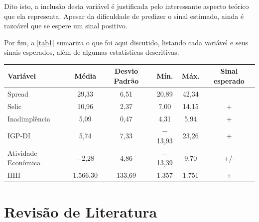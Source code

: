 \documentclass[a4paper,
               article,
               12pt,
               openany,
               oneside,
               english,
               brazil]{abntex2}
\numberwithin{equation}{section}
\begin{document}
    Dito isto, a inclusão desta variável é justificada pelo interessante aspecto teórico que ela representa. Apesar da dificuldade de predizer o sinal estimado, ainda é razoável que se espere um sinal positivo.

    Por fim, a \autoref{tab1} sumariza o que foi aqui discutido, listando cada variável e seus sinais esperados, além de algumas estatísticas descritivas.

    \begin{table}[h]
        {%
            \begin{tabular}
                {@{\extracolsep{5pt}}lccccc}
                \midrule
                Variável              & \multicolumn{1}{c}{Média} & \multicolumn{1}{c}{Desvio Padrão} & \multicolumn{1}{c}{Mín.} & \multicolumn{1}{c}{Máx.} & \multicolumn{1}{c}{Sinal esperado} \\
                \midrule
                Spread                & 29,33                     & 6,51                              & 20,89                    & 42,34                    &  \\
                Selic                 & 10,96                     & 2,37                              & 7,00                     & 14,15                    & + \\
                Inadimplência         & 5,09                      & 0,47                              & 4,31                     & 5,94                     & + \\
                IGP-DI                & 5,74                      & 7,33                              & $-$13,93                 & 23,26                    & + \\
                Atividade Econômica   & $-$2,28                   & 4,86                              & $-$13,39                 & 9,70                     & +/- \\
                IHH                   & 1.566,30                  & 133,69                            & 1.357                    & 1.751                    & + \\
                \midrule
            \end{tabular}
        }
        {}
    \end{table}


\section{Revisão de Literatura}
\end{document}
